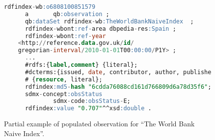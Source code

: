 \begin{figure}[!ht]
\begin{lstlisting}[language=SQL]  
rdfindex-wb:o6808100851579
      a       qb:observation ;
      qb:dataSet rdfindex-wb:TheWorldBankNaiveIndex  ;
      rdfindex-wbont:ref-area dbpedia-res:Spain ;
      rdfindex-wbont:ref-year
	<http://reference.data.gov.uk/id/
	gregorian-interval/2010-01-01T00:00:00/P1Y> ;
      ...
      #rdfs:{label,comment} {literal};
      #dcterms:{issued, date, contributor, author, publisher, identifier} 
      #	{resource, literal};
      rdfindex:md5-hash "6cdda76088cd161d766809d6a78d35f6";
      sdmx-concept:obsStatus
              sdmx-code:obsStatus-E;
      rdfindex:value "0.707"^^xsd:double .
\end{lstlisting}
\caption{Partial example of populated observation for ``The World Bank Naive Index''.}
 \label{fig:generated observation}
\end{figure}


